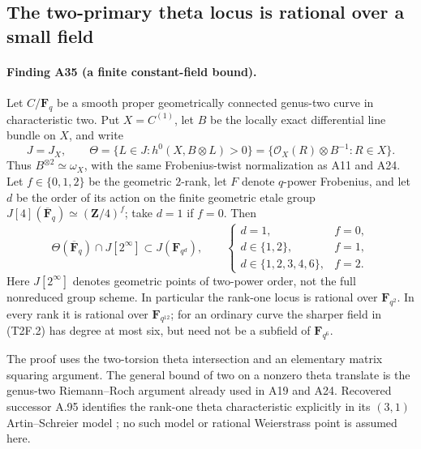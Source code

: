 \documentclass[11pt,a4paper]{article}
\begin{document}
\subsection{The two-primary theta locus is rational over a small field}
\label{sec:two-primary-theta-field}

\paragraph{Finding A35 (a finite constant-field bound).}
Let $C/\mathbf F_q$ be a smooth proper geometrically connected
genus-two curve in characteristic two. Put $X=C^{(1)}$, let $B$ be
the locally exact differential line bundle on $X$, and write
\[
 J=J_X,\qquad
 \Theta=\{L\in J:h^0(X,B\otimes L)>0\}
       =\{\mathcal O_X(R)\otimes B^{-1}:R\in X\}.
 \tag{T2F.1}
\]
Thus $B^{\otimes2}\simeq\omega_X$, with the same Frobenius-twist
normalization as A11 and A24. Let $f\in\{0,1,2\}$ be the
geometric $2$-rank, let $F$ denote $q$-power Frobenius, and let
$d$ be the order of its action on the finite geometric etale group
$J[4](\overline{\mathbf F}_q)\simeq(\mathbf Z/4)^f$; take $d=1$
if $f=0$. Then
\[
 \Theta(\overline{\mathbf F}_q)\cap J[2^\infty]
              \subset J(\mathbf F_{q^d}),
 \qquad
 \begin{cases}
 d=1,&f=0,\\
 d\in\{1,2\},&f=1,\\
 d\in\{1,2,3,4,6\},&f=2.
 \end{cases}
 \tag{T2F.2}
\]
Here $J[2^\infty]$ denotes geometric points of two-power order,
not the full nonreduced group scheme. In particular the rank-one
locus is rational over $\mathbf F_{q^2}$. In every rank it is
rational over $\mathbf F_{q^{12}}$; for an ordinary curve the
sharper field in (T2F.2) has degree at most six, but need not be a
subfield of $\mathbf F_{q^6}$.

The proof uses the two-torsion theta intersection and an elementary
matrix squaring argument. The general bound of two on a nonzero
theta translate is the genus-two Riemann--Roch argument already
used in A19 and A24. Recovered successor A.95 identifies the
rank-one theta characteristic explicitly in its $(3,1)$
Artin--Schreier model \cite[A.95]{ASrun}; no such model or rational
Weierstrass point is assumed here.
\end{document}
